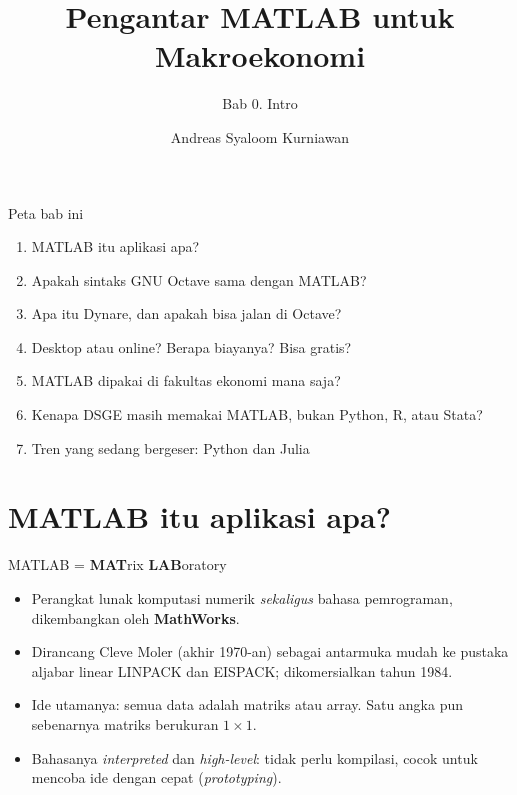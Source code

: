 \documentclass[aspectratio=169,11pt]{beamer}
\title{Pengantar MATLAB untuk Makroekonomi}
\subtitle{Bab 0. Intro}
\author{Andreas Syaloom Kurniawan}
\institute{Faculty of Economics and Business, Universitas Gadjah Mada}
\date{}
\begin{document}
\maketitle

\begin{frame}{Peta bab ini}
\small
\begin{enumerate}
  \item MATLAB itu aplikasi apa?
  \item Apakah sintaks GNU Octave sama dengan MATLAB?
  \item Apa itu Dynare, dan apakah bisa jalan di Octave?
  \item Desktop atau online? Berapa biayanya? Bisa gratis?
  \item MATLAB dipakai di fakultas ekonomi mana saja?
  \item Kenapa DSGE masih memakai MATLAB, bukan Python, R, atau Stata?
  \item Tren yang sedang bergeser: Python dan Julia
\end{enumerate}
\end{frame}

\section{MATLAB itu aplikasi apa?}

\begin{frame}{MATLAB = \textbf{MAT}rix \textbf{LAB}oratory}
\begin{itemize}
  \item Perangkat lunak komputasi numerik \emph{sekaligus} bahasa
        pemrograman, dikembangkan oleh \textbf{MathWorks}.
  \item Dirancang Cleve Moler (akhir 1970-an) sebagai antarmuka mudah ke
        pustaka aljabar linear LINPACK dan EISPACK; dikomersialkan
        tahun 1984.
  \item Ide utamanya: \alert{semua data adalah matriks atau array}.
        Satu angka pun sebenarnya matriks berukuran $1\times 1$.
  \item Bahasanya \emph{interpreted} dan \emph{high-level}: tidak perlu
        kompilasi, cocok untuk mencoba ide dengan cepat (\emph{prototyping}).
\end{itemize}
\end{frame}
\end{document}
